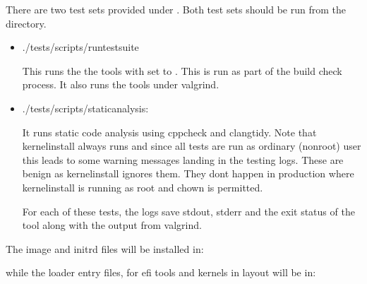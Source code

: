 \documentclass[letterpaper,11pt,english]{sphinxmanual}
\begin{document}
\sphinxAtStartPar
There are two test sets provided under . Both test sets
should be run from the  directory.
\begin{itemize}
\item {} 
\sphinxAtStartPar
./tests/scripts/run\sphinxhyphen{}test\sphinxhyphen{}suite

\sphinxAtStartPar
This runs the the tools with  set to .
This is run as part of the build check process.
It also runs the tools under valgrind.

\item {} 
\sphinxAtStartPar
./tests/scripts/static\sphinxhyphen{}analysis:

\sphinxAtStartPar
It runs static code analysis using cppcheck and clang\sphinxhyphen{}tidy.
Note that kernel\sphinxhyphen{}install always runs  and since all tests are run as ordinary
(non\sphinxhyphen{}root) user this leads to some warning messages landing in the testing logs.
These are benign as kernel\sphinxhyphen{}install ignores them. They dont happen in production
where kernel\sphinxhyphen{}install is running as root and chown is permitted.

\sphinxAtStartPar
For each of these tests, the logs save stdout, stderr and the exit status of the tool
along with the output from valgrind.

\end{itemize}

\sphinxAtStartPar
The image and initrd files will be installed in:

\begin{sphinxVerbatim}[commandchars=\\\{\}]
\end{sphinxVerbatim}

\sphinxAtStartPar
while the loader entry files, for efi tools and kernels in  layout will be in:

\begin{sphinxVerbatim}[commandchars=\\\{\}]
\end{sphinxVerbatim}
\end{document}
